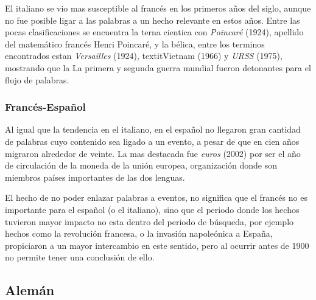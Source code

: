 El italiano se vio mas susceptible al francés en los primeros años del siglo, aunque no fue posible ligar a las palabras a un hecho relevante en estos años. Entre las pocas clasificaciones se encuentra la terna cientica con \textit{Poincaré} (1924), apellido del matemático francés Henri Poincaré, y la bélica,  entre los terminos encontrados estan \textit{Versailles} (1924), textit{Vietnam} (1966)  y \textit{URSS} (1975), mostrando que la  La primera y segunda guerra mundial fueron detonantes para el flujo de palabras.


\subsubsection*{Francés-Español}

Al igual que la tendencia en el italiano, en el español no llegaron gran cantidad de palabras cuyo contenido sea ligado a un evento, a pesar de que en cien años migraron alrededor de veinte. La mas destacada fue \textit{euros} (2002) por ser el año de circulación de la moneda de la unión europea, organización donde son miembros países importantes de las dos lenguas. 

El hecho de no poder enlazar palabras a eventos, no significa que el francés no es importante para el español (o el italiano), sino que el periodo donde los hechos tuvieron mayor impacto no esta dentro del periodo de búsqueda,  por ejemplo hechos como la revolución francesa, o la invasión napoleónica a España, propiciaron a un mayor intercambio en este sentido, pero al ocurrir antes de 1900 no permite tener una conclusión de ello. 


\newpage
\subsection{Alemán}

